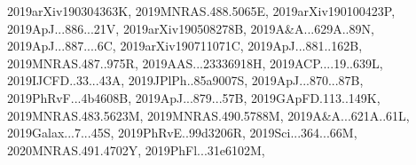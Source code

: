 \documentclass[12pt]{article}
\begin{document}
\begin{description}
{2019arXiv190304363K,%
2019MNRAS.488.5065E,%
2019arXiv190100423P,%
2019ApJ...886...21V,%
2019arXiv190508278B,%
2019A&A...629A..89N,%
2019ApJ...887....6C,%
2019arXiv190711071C,%
2019ApJ...881..162B,%
2019MNRAS.487..975R,%
2019AAS...23336918H,%
2019ACP....19..639L,%
2019IJCFD..33...43A,%
2019JPlPh..85a9007S,%
2019ApJ...870...87B,%
2019PhRvF...4b4608B,%
2019ApJ...879...57B,%
2019GApFD.113..149K,%
2019MNRAS.483.5623M,%
2019MNRAS.490.5788M,%
2019A&A...621A..61L,%
2019Galax...7...45S,%
2019PhRvE..99d3206R,%
2019Sci...364...66M,%
2020MNRAS.491.4702Y,%
2019PhFl...31e6102M,%
}
\end{description}
\end{document}
